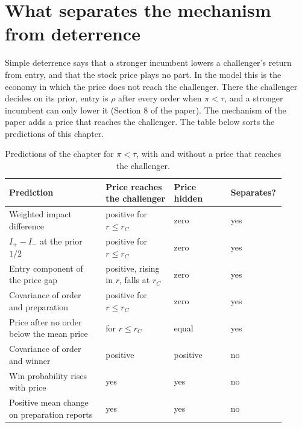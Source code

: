 \section{What separates the mechanism from deterrence}\label{sec:empirical-deterrence}

Simple deterrence says that a stronger incumbent lowers a challenger's return from entry, and that the stock price plays no part. In the model this is the economy in which the price does not reach the challenger. There the challenger decides on its prior, entry is \(\rho\) after every order when \(\pi<\tau\), and a stronger incumbent can only lower it (Section 8 of the paper). The mechanism of the paper adds a price that reaches the challenger. The table below sorts the predictions of this chapter.

\begin{table}[ht]
\centering\small
\caption{Predictions of the chapter for \(\pi<\tau\), with and without a price that reaches the challenger.}\label{tab:empirical-separate}
\begin{tabular}{@{}p{0.34\linewidth}p{0.24\linewidth}p{0.20\linewidth}p{0.13\linewidth}@{}}
\toprule
Prediction & Price reaches the challenger & Price hidden & Separates?\\
\midrule
Weighted impact difference & positive for \(r\le r_C\) & zero & yes\\[2pt]
\(I_+-I_-\) at the prior \(1/2\) & positive for \(r\le r_C\) & zero & yes\\[2pt]
Entry component of the price gap & positive, rising in \(r\), falls at \(r_C\) & zero & yes\\[2pt]
Covariance of order and preparation & positive for \(r\le r_C\) & zero & yes\\[2pt]
Price after no order below the mean price & for \(r\le r_C\) & equal & yes\\[2pt]
Covariance of order and winner & positive & positive & no\\[2pt]
Win probability rises with price & yes & yes & no\\[2pt]
Positive mean change on preparation reports & yes & yes & no\\
\bottomrule
\end{tabular}
\end{table}

